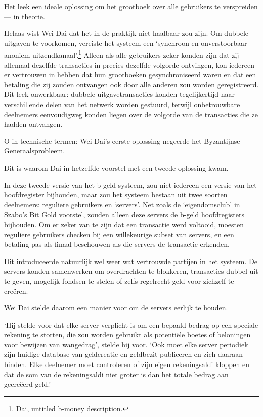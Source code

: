 \documentclass[
  a5paper,
  smalldemyvopaper,11pt,twoside,onecolumn,openright,extrafontsizes]{memoir}
\begin{document}
Het leek een ideale oplossing om het grootboek over alle gebruikers te
verspreiden --- in theorie.

Helaas wist Wei Dai dat het in de praktijk niet haalbaar zou zijn. Om
dubbele uitgaven te voorkomen, vereiste het systeem een `synchroon en
onverstoorbaar anoniem uitzendkanaal'.\footnote{Dai, untitled b-money
  description.} Alleen als alle gebruikers zeker konden zijn dat zij
allemaal dezelfde transacties in precies dezelfde volgorde ontvingen,
kon iedereen er vertrouwen in hebben dat hun grootboeken
gesynchroniseerd waren en dat een betaling die zij zouden ontvangen ook
door alle anderen zou worden geregistreerd. Dit leek onwerkbaar: dubbele
uitgavetransacties konden tegelijkertijd naar verschillende delen van
het netwerk worden gestuurd, terwijl onbetrouwbare deelnemers
eenvoudigweg konden liegen over de volgorde van de transacties die ze
hadden ontvangen.

O in technische termen: Wei Dai's eerste oplossing negeerde het
Byzantijnse Generaalsprobleem.

Dit is waarom Dai in hetzelfde voorstel met een tweede oplossing kwam.

In deze tweede versie van het b-geld systeem, zou niet iedereen een
versie van het hoofdregister bijhouden, maar zou het systeem bestaan uit
twee soorten deelnemers: reguliere gebruikers en `servers'. Net zoals de
`eigendomsclub' in Szabo's Bit Gold voorstel, zouden alleen deze servers
de b-geld hoofdregisters bijhouden. Om er zeker van te zijn dat een
transactie werd voltooid, moesten reguliere gebruikers checken bij een
willekeurige subset van servers, en een betaling pas als finaal
beschouwen als die servers de transactie erkenden.

Dit introduceerde natuurlijk wel weer wat vertrouwde partijen in het
systeem. De servers konden samenwerken om overdrachten te blokkeren,
transacties dubbel uit te geven, mogelijk fondsen te stelen of zelfs
regelrecht geld voor zichzelf te creëren.

Wei Dai stelde daarom een manier voor om de servers eerlijk te houden.

`Hij stelde voor dat elke server verplicht is om een bepaald bedrag op
een speciale rekening te storten, die zou worden gebruikt als potentiële
boetes of beloningen voor bewijzen van wangedrag', stelde hij voor. `Ook
moet elke server periodiek zijn huidige database van geldcreatie en
geldbezit publiceren en zich daaraan binden. Elke deelnemer moet
controleren of zijn eigen rekeningsaldi kloppen en dat de som van de
rekeningsaldi niet groter is dan het totale bedrag aan gecreëerd geld.'
\end{document}
